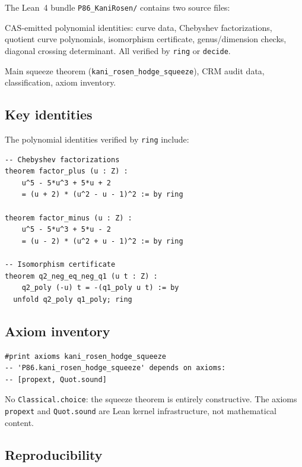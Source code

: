 \documentclass[11pt]{article}
\theoremstyle{plain}
\theoremstyle{definition}
\theoremstyle{remark}
\begin{document}
The Lean~4 bundle \texttt{P86\_KaniRosen/} contains two source files:

\begin{description}[leftmargin=2cm]
  \item[\texttt{QuotientData.lean}] CAS-emitted polynomial identities:
    curve data, Chebyshev factorizations, quotient curve polynomials,
    isomorphism certificate, genus/dimension checks, diagonal crossing
    determinant.  All verified by \texttt{ring} or \texttt{decide}.
  \item[\texttt{Paper86\_KaniRosen.lean}] Main squeeze theorem
    (\texttt{kani\_rosen\_hodge\_squeeze}), CRM audit data,
    classification, axiom inventory.
\end{description}

\subsection{Key identities}

The polynomial identities verified by \texttt{ring} include:

\begin{lstlisting}
-- Chebyshev factorizations
theorem factor_plus (u : Z) :
    u^5 - 5*u^3 + 5*u + 2
    = (u + 2) * (u^2 - u - 1)^2 := by ring

theorem factor_minus (u : Z) :
    u^5 - 5*u^3 + 5*u - 2
    = (u - 2) * (u^2 + u - 1)^2 := by ring

-- Isomorphism certificate
theorem q2_neg_eq_neg_q1 (u t : Z) :
    q2_poly (-u) t = -(q1_poly u t) := by
  unfold q2_poly q1_poly; ring
\end{lstlisting}

\subsection{Axiom inventory}

\begin{lstlisting}
#print axioms kani_rosen_hodge_squeeze
-- 'P86.kani_rosen_hodge_squeeze' depends on axioms:
-- [propext, Quot.sound]
\end{lstlisting}

No \texttt{Classical.choice}: the squeeze theorem is entirely
constructive.  The axioms \texttt{propext} and \texttt{Quot.sound}
are Lean kernel infrastructure, not mathematical content.

\subsection{Reproducibility}
\end{document}
